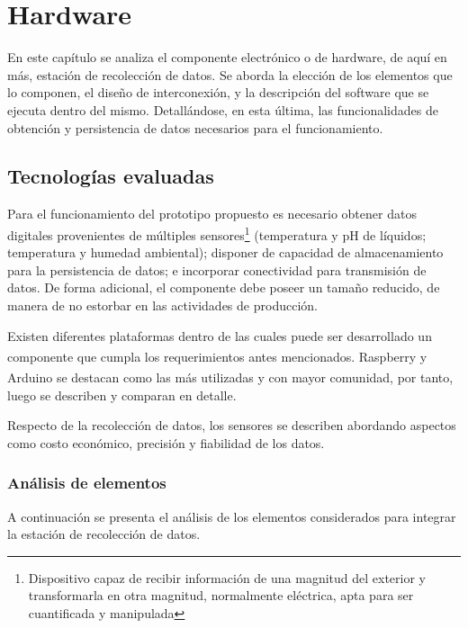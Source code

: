 \chapter{Hardware}

\par En este capítulo se analiza el componente electrónico o de hardware, de aquí en más, estación de recolección de datos. Se aborda la elección de los elementos que lo componen, el diseño de interconexión, y la descripción del software que se ejecuta dentro del mismo. Detallándose, en esta última, las funcionalidades de obtención y persistencia de datos necesarios para el funcionamiento.

\section{Tecnologías evaluadas}
\label{SeccionTecnoEvalHardware}
    \par Para el funcionamiento del prototipo propuesto es necesario obtener datos digitales provenientes de múltiples sensores\footnote{Dispositivo capaz de recibir información de una magnitud del exterior y transformarla en otra magnitud, normalmente eléctrica, apta para ser cuantificada y manipulada} (temperatura y pH de líquidos;  temperatura y humedad ambiental); disponer de capacidad de almacenamiento para la persistencia de datos; e incorporar conectividad para transmisión de datos. De forma adicional, el componente debe poseer un tamaño reducido, de manera de no estorbar en las actividades de producción.

    \par Existen diferentes plataformas dentro de las cuales puede ser desarrollado un componente que cumpla los requerimientos antes mencionados. Raspberry\textsuperscript{\textregistered} y Arduino\textsuperscript{\textregistered} se destacan como las más utilizadas y con mayor comunidad, por tanto, luego se describen y comparan en detalle.
    
    \par Respecto de la recolección de datos, los sensores se describen abordando aspectos como costo económico, precisión y fiabilidad de los datos.
    
    \subsection{Análisis de elementos}
    \par A continuación se presenta el análisis de los elementos considerados para integrar la estación de recolección de datos.
    

